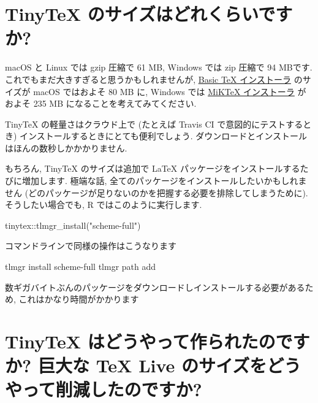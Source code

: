 \documentclass[
  xelatex,ja=standard,jafont=noto]{bxjsreport}
\newenvironment{Shaded}{\begin{snugshade}}{\end{snugshade}}
\newcommand{\ExtensionTok}[1]{#1}
\newcommand{\FunctionTok}[1]{\textcolor[rgb]{0.00,0.00,0.00}{#1}}
\newcommand{\NormalTok}[1]{#1}
\newcommand{\SpecialCharTok}[1]{\textcolor[rgb]{0.00,0.00,0.00}{#1}}
\newcommand{\StringTok}[1]{\textcolor[rgb]{0.31,0.60,0.02}{#1}}
\begin{document}
\hypertarget{faq-tinytex-size}{%
\section{TinyTeX のサイズはどれくらいですか?}\label{faq-tinytex-size}}

macOS と Linux では gzip 圧縮で 61 MB, Windows では zip 圧縮で 94
MBです. これでもまだ大きすぎると思うかもしれませんが,
\href{https://www.tug.org/mactex/morepackages.html}{Basic TeX
インストーラ} のサイズが macOS ではおよそ 80 MB に, Windows では
\href{https://miktex.org/download}{MiKTeX インストーラ} がおよそ 235 MB
になることを考えてみてください.

TinyTeX の軽量さはクラウド上で (たとえば Travis CI
で意図的にテストするとき) インストールするときにとても便利でしょう.
ダウンロードとインストールはほんの数秒しかかかりません.

もちろん, TinyTeX のサイズは追加で LaTeX
パッケージをインストールするたびに増加します. 極端な話,
全てのパッケージをインストールしたいかもしれません
(どのパッケージが足りないのかを把握する必要を排除してしまうために).
そうしたい場合でも, R ではこのように実行します.

\begin{Shaded}
\begin{Highlighting}[numbers=left,,]
\NormalTok{tinytex}\SpecialCharTok{::}\FunctionTok{tlmgr\_install}\NormalTok{(}\StringTok{"scheme{-}full"}\NormalTok{)}
\end{Highlighting}
\end{Shaded}

コマンドラインで同様の操作はこうなります

\begin{Shaded}
\begin{Highlighting}[]
\ExtensionTok{tlmgr}\NormalTok{ install scheme{-}full}
\ExtensionTok{tlmgr}\NormalTok{ path add}
\end{Highlighting}
\end{Shaded}

数ギガバイトぶんのパッケージをダウンロードしインストールする必要があるため,
これはかなり時間がかかります

\hypertarget{tinytex-ux306fux3069ux3046ux3084ux3063ux3066ux4f5cux3089ux308cux305fux306eux3067ux3059ux304b-ux5de8ux5927ux306a-tex-live-ux306eux30b5ux30a4ux30baux3092ux3069ux3046ux3084ux3063ux3066ux524aux6e1bux3057ux305fux306eux3067ux3059ux304b}{%
\section{TinyTeX はどうやって作られたのですか? 巨大な TeX Live
のサイズをどうやって削減したのですか?}\label{tinytex-ux306fux3069ux3046ux3084ux3063ux3066ux4f5cux3089ux308cux305fux306eux3067ux3059ux304b-ux5de8ux5927ux306a-tex-live-ux306eux30b5ux30a4ux30baux3092ux3069ux3046ux3084ux3063ux3066ux524aux6e1bux3057ux305fux306eux3067ux3059ux304b}}
\end{document}
